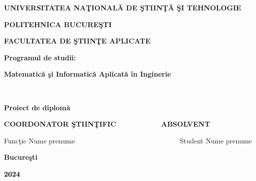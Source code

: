 \documentclass[a4paper,12pt,twoside,reqno]{report}
\begin{document}
\begin{titlepage}




\centerline{\bf  UNIVERSITATEA NA\c TIONAL\u A DE \c STIIN\c T\u A
\c SI TEHNOLOGIE}

\centerline{\bf POLITEHNICA BUCURE\c STI}

\centerline{\bf FACULTATEA DE \c STIIN\c TE APLICATE}

\centerline{\bf Programul de studii: } \centerline{\bf Matematic\u a
\c si Informatic\u a Aplicat\u a \^ in Inginerie}



\vspace{1cm} ~~~


\vspace{2cm}
\begin{center}

{\Huge \bf Proiect de diplom\u a \vspace{1cm}}

\end{center}

\vspace{3cm}
\begin{flushleft}

{\large \bf COORDONATOR \c STIIN\c TIFIC\ \ \ \ \ \ \ \ \ \ \
\,ABSOLVENT} \vspace{5pt}

Func\c tie Nume prenume \ \ \ \ \ \ \ \ \ \ \ \ \ \ \ \ \ \ \ \ \ \
\ \ \ \ \ \ \quad \quad \quad \,\,\, Student Nume prenume


\end{flushleft}

\vspace{4 cm}


\begin{center}

{\Large {\bf Bucure\c sti} \vspace{5pt}


${\bf 2024}$ }

\end{center}

\end{titlepage}
\end{document}
